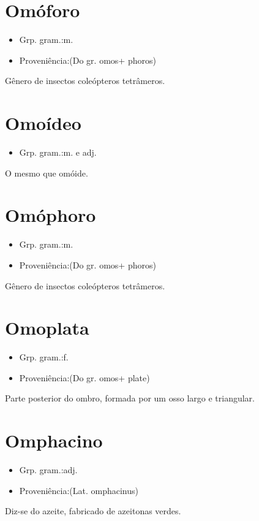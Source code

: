 \section{Omóforo}
\begin{itemize}
\item {Grp. gram.:m.}
\end{itemize}
\begin{itemize}
\item {Proveniência:(Do gr. \textunderscore omos\textunderscore  + \textunderscore phoros\textunderscore )}
\end{itemize}
Gênero de insectos coleópteros tetrâmeros.
\section{Omoídeo}
\begin{itemize}
\item {Grp. gram.:m.  e  adj.}
\end{itemize}
O mesmo que \textunderscore omóide\textunderscore .
\section{Omóphoro}
\begin{itemize}
\item {Grp. gram.:m.}
\end{itemize}
\begin{itemize}
\item {Proveniência:(Do gr. \textunderscore omos\textunderscore  + \textunderscore phoros\textunderscore )}
\end{itemize}
Gênero de insectos coleópteros tetrâmeros.
\section{Omoplata}
\begin{itemize}
\item {Grp. gram.:f.}
\end{itemize}
\begin{itemize}
\item {Proveniência:(Do gr. \textunderscore omos\textunderscore  + \textunderscore plate\textunderscore )}
\end{itemize}
Parte posterior do ombro, formada por um osso largo e triangular.
\section{Omphacino}
\begin{itemize}
\item {Grp. gram.:adj.}
\end{itemize}
\begin{itemize}
\item {Proveniência:(Lat. \textunderscore omphacinus\textunderscore )}
\end{itemize}
Diz-se do azeite, fabricado de azeitonas verdes.
